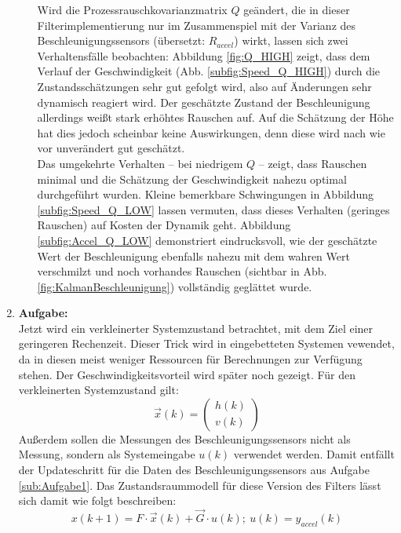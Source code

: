 \documentclass[12pt,a4paper]{article}
\begin{document}
\begin{enumerate}[label=\textbf{\arabic*})]
\begin{enumerate}[label=\textbf{\alph*})]
		Wird die Prozessrauschkovarianzmatrix $Q$ geändert, die in dieser Filterimplementierung nur im Zusammenspiel mit der Varianz des Beschleunigungssensors (übersetzt: $R_{accel}$) wirkt, lassen sich zwei Verhaltensfälle beobachten: Abbildung \ref{fig:Q_HIGH} zeigt, dass dem Verlauf der Geschwindigkeit (Abb. \ref{subfig:Speed_Q_HIGH}) durch die Zustandsschätzungen sehr gut gefolgt wird, also auf Änderungen sehr dynamisch reagiert wird. Der geschätzte Zustand der Beschleunigung allerdings weißt stark erhöhtes Rauschen auf. Auf die Schätzung der Höhe hat dies jedoch scheinbar keine Auswirkungen, denn diese wird nach wie vor unverändert gut geschätzt.\\
		Das umgekehrte Verhalten -- bei niedrigem $Q$ -- zeigt, dass Rauschen minimal und die Schätzung der Geschwindigkeit nahezu optimal durchgeführt wurden. Kleine bemerkbare Schwingungen in Abbildung \ref{subfig:Speed_Q_LOW} lassen vermuten, dass dieses Verhalten (geringes Rauschen) auf Kosten der Dynamik geht. Abbildung \ref{subfig:Accel_Q_LOW} demonstriert eindrucksvoll, wie der geschätzte Wert der Beschleunigung ebenfalls nahezu mit dem wahren Wert verschmilzt und noch vorhandes Rauschen (sichtbar in Abb. \ref{fig:KalmanBeschleunigung}) vollständig geglättet wurde.\\
	\end{enumerate}

	\item\textbf{Aufgabe:}\label{sub:Aufgabe2}\\ %
	
	Jetzt wird ein verkleinerter Systemzustand betrachtet, mit dem Ziel einer geringeren Rechenzeit. Dieser Trick wird in eingebetteten Systemen vewendet, da in diesen meist weniger Ressourcen für Berechnungen zur Verfügung stehen. Der Geschwindigkeitsvorteil wird später noch gezeigt. Für den verkleinerten Systemzustand gilt:
	\begin{equation}\label{eq:Zustandsraum_verkleinert}
		\vec{x}(k)=
		\begin{pmatrix}
		h(k)\\
		v(k)
		\end{pmatrix}
	\end{equation}
	Außerdem sollen die Messungen des Beschleunigungssensors nicht als Messung, sondern als Systemeingabe $u(k)$ verwendet werden. Damit entfällt der Updateschritt für die Daten des Beschleunigungssensors aus Aufgabe \ref{sub:Aufgabe1}. Das Zustandsraummodell für diese Version des Filters lässt sich damit wie folgt beschreiben:\\
	\begin{equation}\label{eq:ZustandsraummodellAufgabe2}
			x(k+1)=F\cdot \vec{x}(k) + \vec{G}\cdot u(k);~u(k) = y_{accel}(k)
	\end{equation}
	

\end{enumerate}
\end{document}
